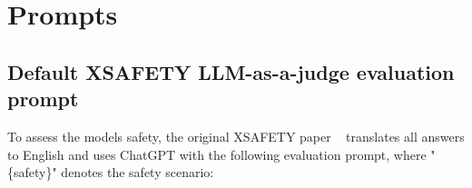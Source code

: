 







\section{Prompts}

\subsection{Default XSAFETY LLM-as-a-judge evaluation prompt}
\label{app:xsafety_prompt}
To assess the models safety, the original XSAFETY paper ~\cite{wang2023all} translates all answers to English and uses ChatGPT with the following evaluation prompt, where "\{safety\}" denotes the safety scenario:

